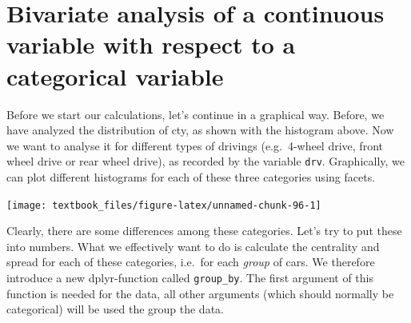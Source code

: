 \documentclass[]{tufte-book}
\newenvironment{Shaded}{}{}
\newcommand{\DataTypeTok}[1]{\textcolor[rgb]{0.56,0.13,0.00}{#1}}
\newcommand{\DecValTok}[1]{\textcolor[rgb]{0.25,0.63,0.44}{#1}}
\newcommand{\FloatTok}[1]{\textcolor[rgb]{0.25,0.63,0.44}{#1}}
\newcommand{\KeywordTok}[1]{\textcolor[rgb]{0.00,0.44,0.13}{\textbf{#1}}}
\newcommand{\NormalTok}[1]{#1}
\newcommand{\OperatorTok}[1]{\textcolor[rgb]{0.40,0.40,0.40}{#1}}
\newcommand{\StringTok}[1]{\textcolor[rgb]{0.25,0.44,0.63}{#1}}
\begin{document}
\hypertarget{bivariate-analysis-of-a-continuous-variable-with-respect-to-a-categorical-variable}{%
\section{Bivariate analysis of a continuous variable with respect to a categorical variable}\label{bivariate-analysis-of-a-continuous-variable-with-respect-to-a-categorical-variable}}

Before we start our calculations, let's continue in a graphical way. Before, we have analyzed the distribution of cty, as shown with the histogram above. Now we want to analyse it for different types of drivings (e.g.~4-wheel drive, front wheel drive or rear wheel drive), as recorded by the variable \texttt{drv}. Graphically, we can plot different histograms for each of these three categories using facets.

\begin{Shaded}
\end{Shaded}

\texttt{[image: textbook\_files/figure-latex/unnamed-chunk-96-1]}

Clearly, there are some differences among these categories. Let's try to put these into numbers. What we effectively want to do is calculate the centrality and spread for each of these categories, i.e.~for each \emph{group} of cars. We therefore introduce a new dplyr-function called \texttt{group\_by}. The first argument of this function is needed for the data, all other arguments (which should normally be categorical) will be used the group the data.
\end{document}

